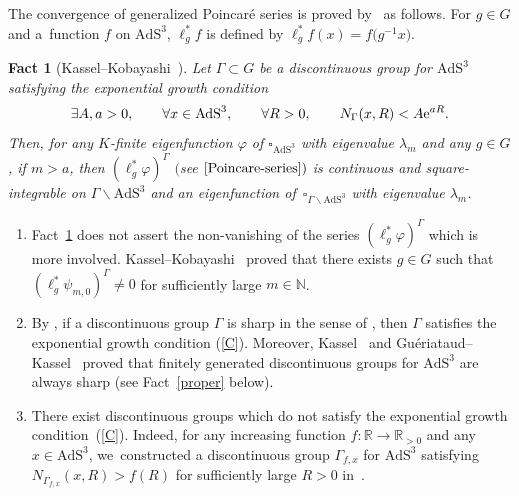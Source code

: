 \documentclass[pdftex]{sigma}
\numberwithin{equation}{section}
\newtheorem{Fact}[Theorem]{Fact}
 { \theoremstyle{definition}
\newtheorem{Definition}[Theorem]{Definition}
\newtheorem{Note}[Theorem]{Note}
\newtheorem{Example}[Theorem]{Example}
\newtheorem{Remark}[Theorem]{Remark}
\newtheorem{Setting}[Theorem]{Setting}
\newtheorem{Notation}[Theorem]{Notation}
}
\begin{document}
The convergence of generalized Poincar\'e series is proved by~\cite{KaKob16} as follows.
For $g \in G$ and a~function $f$ on $\mathrm{AdS}^{3}$,
$\ell_{g}^{*}f$ is defined by $\ell_{g}^{*}f(x)=f\big(g^{-1}x\big)$.
\begin{Fact}[Kassel--Kobayashi~\cite{KaKob16}]\label{Poincare}
Let $\Gamma \subset G$ be a discontinuous group for $\mathrm{AdS}^{3}$
satisfying the exponential growth condition
\begin{gather}\label{C}
\exists A,a > 0,\qquad
\forall x\in \mathrm{AdS}^{3},\qquad
\forall R>0, \qquad
N_{\Gamma}(x,R) < A{\rm e}^{aR}.
\end{gather}
Then, for any $K$-finite eigenfunction $\varphi$ of $\square_{\mathrm{AdS}^{3}}$ with eigenvalue
$\lambda_{m}$
and any $g\in G$,
if $m > a$, then
$(\ell_{g}^{*}\varphi)^{\Gamma}$ $($see $\eqref{Poincare-series})$ is continuous and square-integrable on
$\Gamma\backslash\mathrm{AdS}^{3}$ and
an eigenfunction of~$\square_{\Gamma\backslash\mathrm{AdS}^{3}}$ with eigenvalue
$\lambda_{m}$.
\end{Fact}

\begin{Remark}\label{remPoincare}\quad
\begin{enumerate}\itemsep=0pt
\item[(1)]
Fact~\ref{Poincare} does not assert the non-vanishing of the series
$(\ell_{g}^{*}\varphi)^{\Gamma}$ which is more involved.
Kassel--Kobayashi~\cite{KaKob16} proved that
there exists $g\in G$ such that
$(\ell^{*}_{g}\psi_{m,0})^{\Gamma}\neq 0$
for sufficiently large $m \in \mathbb{N}$.
\item[(2)]
By \cite[Lemma~4.6.4]{KaKob16}, if a discontinuous group $\Gamma$ is sharp
in the sense of \cite[Definition~4.2]{KaKob16},
then $\Gamma$ satisfies the exponential growth condition (\ref{C}).
Moreover, Kassel~\cite{Ka09} and Gu\'eriataud--Kassel~\cite{GuKa17}
proved that finitely generated discontinuous groups for $\mathrm{AdS}^{3}$
are always sharp (see Fact~\ref{proper} below).
\item[(3)]
There exist discontinuous groups
which do not satisfy the exponential growth condition~(\ref{C}).
Indeed, for any increasing function $f\colon\mathbb{R}\rightarrow \mathbb{R}_{>0}$
and any $x\in\mathrm{AdS}^{3}$,
we~con\-st\-ructed
a discontinuous group $\Gamma_{f,x}$ for $\mathrm{AdS}^{3}$
satisfying $N_{\Gamma_{f,x}}(x,R) > f(R)$ for sufficiently large $R>0$ in~\cite{Kan19}.
\end{enumerate}
\end{Remark}
\end{document}
